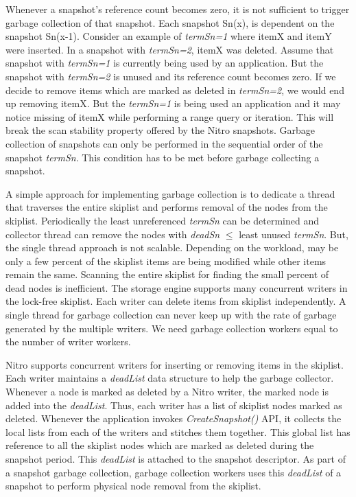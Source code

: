 \documentclass{vldb}
\begin{document}
Whenever a snapshot's reference count becomes zero, it is not sufficient to trigger garbage collection of that snapshot. Each snapshot Sn(x), is dependent on the snapshot Sn(x-1). Consider an example of \textit{termSn=1} where itemX and itemY were inserted. In a snapshot with \textit{termSn=2}, itemX was deleted. Assume that snapshot with \textit{termSn=1} is currently being used by an application. But the snapshot with \textit{termSn=2} is unused and its reference count becomes zero. If we decide to remove items which are marked as deleted in \textit{termSn=2}, we would end up removing itemX. But the \textit{termSn=1} is being used an application and it may notice missing of itemX while performing a range query or iteration. This will break the scan stability property offered by the Nitro snapshots. Garbage collection of snapshots can only be performed in the sequential order of the snapshot \textit{termSn}. This condition has to be met before garbage collecting a snapshot.

A simple approach for implementing garbage collection is to dedicate a thread that traverses the entire skiplist and performs removal of the nodes from the skiplist. Periodically the least unreferenced \textit{termSn} can be determined and collector thread can remove the nodes with \textit{deadSn} $\leq$ least unused \textit{termSn}. But, the single thread approach is not scalable. Depending on the workload, may be only a few percent of the skiplist items are being modified while other items remain the same. Scanning the entire skiplist for finding the small percent of dead nodes is inefficient. The storage engine supports many concurrent writers in the lock-free skiplist. Each writer can delete items from skiplist independently. A single thread for garbage collection can never keep up with the rate of garbage generated by the multiple writers. We need garbage collection workers equal to the number of writer workers. 

Nitro supports concurrent writers for inserting or removing items in the skiplist. Each writer maintains a \textit{deadList} data structure to help the garbage collector. Whenever a node is marked as deleted by a Nitro writer, the marked node is added into the \textit{deadList}. Thus, each writer has a list of skiplist nodes marked as deleted. Whenever the application invokes \textit{CreateSnapshot()} API, it collects the local lists from each of the writers and stitches them together. This global list has reference to all the skiplist nodes which are marked as deleted during the snapshot period. This \textit{deadList} is attached to the snapshot descriptor. As part of a snapshot garbage collection, garbage collection workers uses this \textit{deadList} of a snapshot to perform physical node removal from the skiplist.
    
\end{document}
